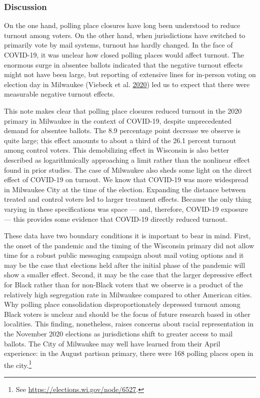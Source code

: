 \documentclass[
  12pt,
]{article}
\begin{document}
\hypertarget{discussion}{%
\subsubsection*{Discussion}\label{discussion}}

On the one hand, polling place closures have long been understood to reduce turnout among voters. On the other hand, when jurisdictions have switched to primarily vote by mail systems, turnout has hardly changed. In the face of COVID-19, it was unclear how closed polling places would affect turnout. The enormous surge in absentee ballots indicated that the negative turnout effects might not have been large, but reporting of extensive lines for in-person voting on election day in Milwaukee (Viebeck et al. \protect\hyperlink{ref-Viebeck2020}{2020}) led us to expect that there were measurable negative turnout effects.

This note makes clear that polling place closures reduced turnout in the 2020 primary in Milwaukee in the context of COVID-19, despite unprecedented demand for absentee ballots. The 8.9 percentage point decrease we observe is quite large; this effect amounts to about a third of the 26.1 percent turnout among control voters. This demobilizing effect in Wisconsin is also better described as logarithmically approaching a limit rather than the nonlinear effect found in prior studies. The case of Milwaukee also sheds some light on the direct effect of COVID-19 on turnout. We know that COVID-19 was more widespread in Milwaukee City at the time of the election. Expanding the distance between treated and control voters led to larger treatment effects. Because the only thing varying in these specifications was space --- and, therefore, COVID-19 exposure --- this provides some evidence that COVID-19 directly reduced turnout.

These data have two boundary conditions it is important to bear in mind. First, the onset of the pandemic and the timing of the Wisconsin primary did not allow time for a robust public messaging campaign about mail voting options and it may be the case that elections held after the initial phase of the pandemic will show a smaller effect. Second, it may be the case that the larger depressive effect for Black rather than for non-Black voters that we observe is a product of the relatively high segregation rate in Milwaukee compared to other American cities. Why polling place consolidation disproportionately depressed turnout among Black voters is unclear and should be the focus of future research based in other localities. This finding, nonetheless, raises concerns about racial representation in the November 2020 elections as jurisdictions shift to greater access to mail ballots. The City of Milwaukee may well have learned from their April experience: in the August partisan primary, there were 168 polling places open in the city.\footnote{See \url{https://elections.wi.gov/node/6527}.}
\end{document}
